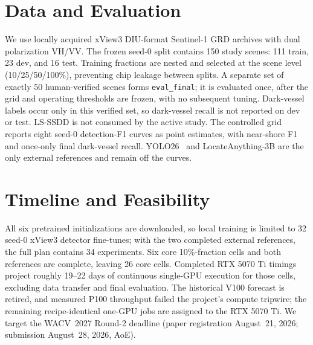 \documentclass[10pt,twocolumn,letterpaper]{article}
\begin{document}
\section{Data and Evaluation}
\label{sec:data}
We use locally acquired xView3 DIU-format Sentinel-1 GRD archives with dual
polarization VH/VV. The frozen seed-0 split contains 150 study scenes: 111
train, 23 dev, and 16 test. Training fractions are nested and selected at the
scene level (10/25/50/100\%), preventing chip leakage between splits. A
separate set of exactly 50 human-verified scenes forms
\texttt{eval\_final}; it is evaluated once, after the grid and operating
thresholds are frozen, with no subsequent tuning. Dark-vessel labels occur
only in this verified set, so dark-vessel recall is not reported on dev or
test. LS-SSDD is not consumed by the active study. The controlled grid reports
eight seed-0 detection-F1 curves as point estimates, with near-shore F1 and
once-only final dark-vessel recall. YOLO26~\cite{jocher2026yolo26} and
LocateAnything-3B are the only external references and remain off the curves.

\section{Timeline and Feasibility}
\label{sec:timeline}
All six pretrained initializations are downloaded, so local training is
limited to 32 seed-0 xView3 detector fine-tunes; with the two completed
external references, the full plan contains 34 experiments. Six core
10\%-fraction cells and both references are complete, leaving 26 core cells.
Completed RTX 5070 Ti timings project roughly 19--22 days of continuous
single-GPU execution for those cells, excluding data transfer and final
evaluation. The historical V100 forecast is retired, and measured P100
throughput failed the project's compute tripwire; the remaining
recipe-identical one-GPU jobs are assigned to the RTX 5070 Ti. We target the
WACV~2027 Round-2 deadline (paper registration August~21, 2026; submission
August~28, 2026, AoE).

{
    \small
    
    
}
\end{document}
